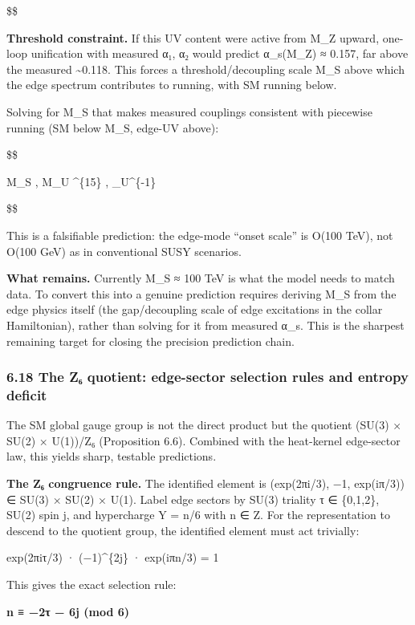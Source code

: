 \documentclass[11pt,a4paper]{article}
\theoremstyle{remark}
\begin{document}
\$\$

\textbf{Threshold constraint.} If this UV content were active from M\_Z upward, one-loop unification with measured α₁, α₂ would predict α\_s(M\_Z) ≈ 0.157, far above the measured \textasciitilde0.118. This forces a threshold/decoupling scale M\_S above which the edge spectrum contributes to running, with SM running below.

Solving for M\_S that makes measured couplings consistent with piecewise running (SM below M\_S, edge-UV above):

\$\$

M\_S  , \quad M\_U  \^{}\{15\} , \quad \alpha\_U\^{}\{-1\} 

\$\$

This is a falsifiable prediction: the edge-mode ``onset scale'' is O(100 TeV), not O(100 GeV) as in conventional SUSY scenarios.

\textbf{What remains.} Currently M\_S ≈ 100 TeV is what the model needs to match data. To convert this into a genuine prediction requires deriving M\_S from the edge physics itself (the gap/decoupling scale of edge excitations in the collar Hamiltonian), rather than solving for it from measured α\_s. This is the sharpest remaining target for closing the precision prediction chain.

\subsubsection{6.18 The Z₆ quotient: edge-sector selection rules and entropy deficit}\label{the-zux2086-quotient-edge-sector-selection-rules-and-entropy-deficit}

The SM global gauge group is not the direct product but the quotient
(SU(3) × SU(2) × U(1))/Z₆ (Proposition 6.6). Combined with
the heat-kernel edge-sector law, this yields sharp, testable predictions.

\textbf{The Z₆ congruence rule.} The identified element is (exp(2πi/3), −1, exp(iπ/3)) ∈ SU(3) × SU(2) × U(1). Label edge sectors by SU(3) triality τ ∈ \{0,1,2\}, SU(2) spin j, and hypercharge Y = n/6 with n ∈ Z. For the representation to descend to the quotient group, the identified element must act trivially:

exp(2πiτ/3) · (−1)\^{}\{2j\} · exp(iπn/3) = 1

This gives the exact selection rule:

\textbf{n ≡ −2τ − 6j (mod 6)}
\end{document}
